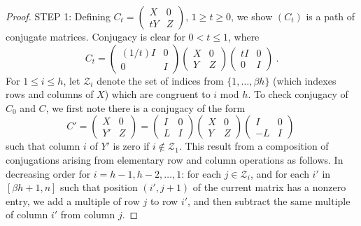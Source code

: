 \documentclass{amsart}
\theoremstyle{definition}
\theoremstyle{remark}
\numberwithin{equation}{section}
\begin{document}
{{\begin{proof}
STEP 1: Defining 
$C_t= 
\left(\begin{smallmatrix} X & 0 \\ tY & Z 
\end{smallmatrix} \right)$, $1\geq t\geq 0$, we 
show $(C_t)$ is a path of conjugate matrices. 
Conjugacy is clear for $0<t\leq 1$, where 
\[
C_t= 
\begin{pmatrix} 
(1/t)I & 0 \\ 0 & I 
\end{pmatrix} 
\begin{pmatrix} 
X & 0 \\ Y & Z 
\end{pmatrix} 
\begin{pmatrix} 
tI & 0 \\ 0 & I 
\end{pmatrix} \ . 
\] 
For $1\leq i \leq h$, let 
$\mathcal Z_i$ denote the set of indices from 
$\{1,\dots ,\beta h\}$ (which indexes rows and 
columns of $X$) which are congruent to $i$ 
mod $h$. 
To check conjugacy of $C_0$ and $C$, 
we first note there is a conjugacy of the form 
\[
C'= 
\begin{pmatrix} 
X & 0 \\ Y' & Z 
\end{pmatrix} 
=
\begin{pmatrix} 
I & 0 \\ L & I 
\end{pmatrix} 
\begin{pmatrix} 
X & 0 \\ Y & Z 
\end{pmatrix} 
\begin{pmatrix} 
I & 0 \\ -L & I 
\end{pmatrix} \  
\] 
such that column $i$ of $Y'$ is zero if $i\notin \mathcal Z_1$. 
This result from a composition of conjugations 
arising from  elementary
row and column operations as follows. In decreasing order for
$i=h-1,h-2,\dots , 1$:  for each $j\in \mathcal Z_i$, 
and for each $i'$ in 
$[\beta h +1,  n]$ such that position 
$(i',j+1)$ of the current matrix 
has  a nonzero entry, 
 we add a multiple of row $j$ to row $i'$, and 
then subtract the same multiple of 
column $i'$ from column $j$. 


\end{proof}}}
\end{document}
